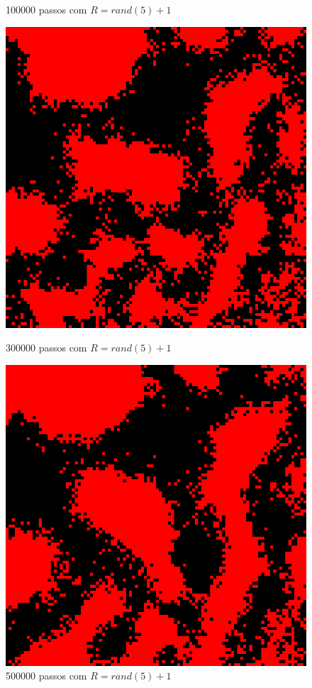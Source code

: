 \documentclass[conference]{IEEEtran}
\begin{document}
\begin{figure}[H]
\begin{minipage}[b]{0.5\linewidth}
    \caption{100000 passos com $R=rand(5)+1$} 
    \vspace{4ex}
  \end{minipage} 
  \begin{minipage}[b]{0.5\linewidth}
    \centering
    \includegraphics[width=.8\linewidth]{resultados/5-3-rand.png} 
    \caption{300000 passos com $R=rand(5)+1$} 
    \vspace{4ex}
  \end{minipage}%
  \begin{minipage}[b]{0.5\linewidth}
    \centering
    \includegraphics[width=.8\linewidth]{resultados/5-6-rand.png} 
    \caption{500000 passos com $R=rand(5)+1$} 
    \vspace{4ex}
  \end{minipage} 
\end{figure}
\end{document}
